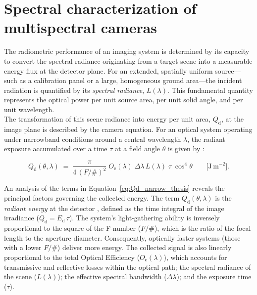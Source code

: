 \section{Spectral characterization of multispectral cameras}
\label{sec:spectral_characterization}

\noindent The radiometric performance of an imaging system is determined by its capacity to convert the spectral radiance originating from a target scene into a measurable energy flux at the detector plane. For an extended, spatially uniform source—such as a calibration panel or a large, homogeneous ground area—the incident radiation is quantified by its \textit{spectral radiance}, \(L(\lambda)\). This fundamental quantity represents the optical power per unit source area, per unit solid angle, and per unit wavelength.\\

\noindent The transformation of this scene radiance into energy per unit area, \(Q_{\mathrm d}\), at the image plane is described by the camera equation. For an optical system operating under narrowband conditions around a central wavelength \(\lambda\), the radiant exposure accumulated over a time \(\tau\) at a field angle \(\theta\) is given by \cite{joseph2015building-ebook}:

\begin{equation}
    Q_{\mathrm d}(\theta,\lambda)
    \;=\;
    \frac{\pi}{4\,(F/\#)^{2}}\; O_{\mathrm e}(\lambda)\;\Delta \lambda\,L(\lambda)\;\tau\;\cos^{4}\!\theta
    \qquad\big[\mathrm{J\,m^{-2}}\big].
    \label{eq:Qd_narrow_thesis}
\end{equation}

\noindent An analysis of the terms in Equation~\eqref{eq:Qd_narrow_thesis} reveals the principal factors governing the collected energy. The term \(Q_{\mathrm d}(\theta,\lambda)\) is the \textit{radiant energy} at the detector \cite{joseph2015building-ebook}, defined as the time integral of the image irradiance (\(Q_{\mathrm d}=E_{\mathrm d}\,\tau\)). The system's light-gathering ability is inversely proportional to the square of the F-number (\(F/\#\)), which is the ratio of the focal length to the aperture diameter. Consequently, optically faster systems (those with a lower \(F/\#\)) deliver more energy. The collected signal is also linearly proportional to the total Optical Efficiency (\(O_{\mathrm e}(\lambda)\)), which accounts for transmissive and reflective losses within the optical path; the spectral radiance of the scene (\(L(\lambda)\)); the effective spectral bandwidth (\(\Delta\lambda\)); and the exposure time (\(\tau\)).\\

